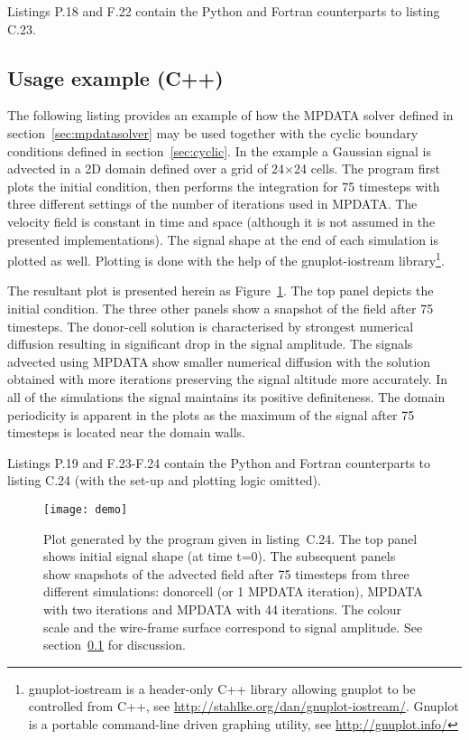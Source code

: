 \documentclass[gmd]{copernicus}%
\newcounter{lstnocpp}
\newcounter{linenocpp}
\newcommand*\FancyVerbStartString{}
\newcommand*\FancyVerbStopString{}
\newcommand{\codecpp}[4]{%
  \addtocounter{lstnocpp}{1}%
  \renewcommand*\FancyVerbStartString{\PY{c+c1}{//#2}}%
  \renewcommand*\FancyVerbStopString{\PY{c+c1}{//#3}}%
  \setcounter{FancyVerbLine}{\thelinenocpp}%
  \fvset{label={listing~C.\thelstnocpp~(C++)},rulecolor=\color{black},stepnumber=#4}%
  \setcounter{linenocpp}{\value{FancyVerbLine}}%
}
\begin{document}
  Listings P.18 and F.22 contain the Python and Fortran counterparts to listing C.23.
 
  \subsection{Usage example (C++)}\label{sec:example}

  The following listing provides an example of how the MPDATA solver
    defined in section~\ref{sec:mpdatasolver} may be used together
    with the cyclic boundary conditions defined in section~\ref{sec:cyclic}.
  In the example a Gaussian signal is advected in a 2D domain 
    defined over a grid of 24$\times$24 cells.
  The program first plots the initial condition, then performs
    the integration for 75 timesteps with three different 
    settings of the number of iterations used in MPDATA.
  The velocity field is constant in time and space (although it is
    not assumed in the presented implementations).
  The signal shape at the end of each simulation is plotted as well.
  Plotting is done with the help of the gnuplot-iostream library\footnote{gnuplot-iostream
    is a header-only C++ library allowing gnuplot to be controlled from C++, see \url{http://stahlke.org/dan/gnuplot-iostream/}. 
    Gnuplot is a portable command-line driven graphing utility, see \url{http://gnuplot.info/}}.

  The resultant plot is presented herein as Figure~\ref{fig:mpdata}.
  The top panel depicts the initial condition. 
  The three other panels show a snapshot of the field after 75 timesteps.
  The donor-cell solution is characterised by strongest numerical diffusion
    resulting in significant drop in the signal amplitude.
  The signals advected using MPDATA show smaller numerical diffusion with
    the solution obtained with more iterations preserving the signal altitude 
    more accurately.
  In all of the simulations the signal maintains its positive definiteness.
  The domain periodicity is apparent in the plots as the maximum of the signal 
    after 75 timesteps is located near the domain walls.

  Listings P.19 and F.23-F.24 contain the Python and Fortran 
    counterparts to listing C.24 (with the set-up and plotting logic omitted).

  \codecpp{code-cpp-plot.cpp}{listing20}{listing21}{1}

  \begin{figure}
    \texttt{[image: demo]}
    \caption{\label{fig:mpdata}
      Plot generated by the program given in listing~C.24.
      The top panel shows initial signal shape (at time t=0).
      The subsequent panels show snapshots of the advected field after 75 timesteps
        from three different simulations: donorcell (or 1 MPDATA iteration), MPDATA
        with two iterations and MPDATA with 44 iterations.
      The colour scale and the wire-frame surface correspond to signal amplitude.
      See section~\ref{sec:example} for discussion.
    }
  \end{figure}
\end{document}
